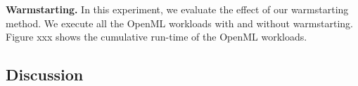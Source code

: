 \textbf{Warmstarting.}
In this experiment, we evaluate the effect of our warmstarting method.
We execute all the OpenML workloads with and without warmstarting.
Figure xxx shows the cumulative run-time of the OpenML workloads.
\subsection{Discussion}
